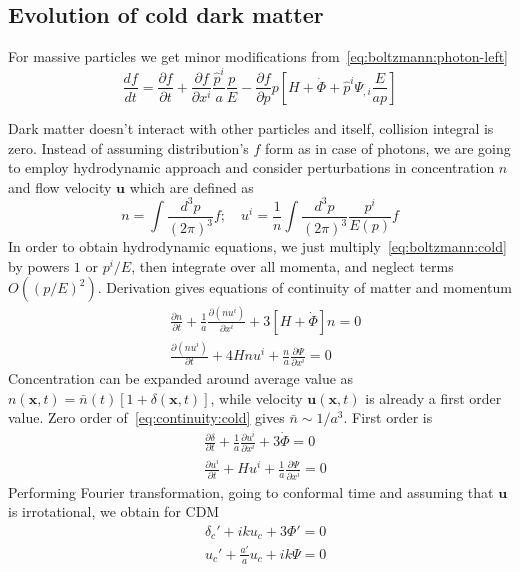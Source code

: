 \documentclass[12pt]{extarticle}
\numberwithin{problem}{section}
\numberwithin{theorem}{section}
\begin{document}
	\subsection{Evolution of cold dark matter}
	For massive particles we get minor modifications from~\ref{eq:boltzmann:photon-left}
	\begin{equation}
		\label{eq:boltzmann:cold}
		\frac{df}{dt} = \frac{\partial f}{\partial t} + \frac{\partial f}{\partial x^i}\frac{\hat{p}^i}{a}\frac{p}{E} - \frac{\partial f}{\partial p}p\left[H + \dot{\Phi} + \hat{p}^i\Psi_{,i} \frac{E}{ap}\right]
	\end{equation}
	
	Dark matter doesn't interact with other particles and itself, collision integral is zero. Instead of assuming distribution's $f$ form as in case of photons, we are going to employ hydrodynamic approach and consider perturbations in concentration $n$ and flow velocity $\mathbf{u}$ which are defined as
	\begin{equation}
		n = \int\frac{d^3p}{(2\pi)^3} f;\quad u^i = \frac{1}{n}\int\frac{d^3p}{(2\pi)^3} \frac{p^i}{E(p)}f
	\end{equation}
	In order to obtain hydrodynamic equations, we just multiply~\ref{eq:boltzmann:cold} by powers $1$ or $p^i/E$, then integrate over all momenta, and neglect terms $O((p/E)^2)$. Derivation gives equations of continuity of matter and momentum
	\begin{align}
		\label{eq:continuity:cold}
		& \frac{\partial n}{\partial t} + \frac{1}{a}\frac{\partial (nu^i)}{\partial x^i} + 3[H + \dot{\Phi}]n = 0\\
		\label{eq:momentum:cold}
		& \frac{\partial(nu^i)}{\partial t} + 4Hnu^i + \frac{n}{a}\frac{\partial \Psi}{\partial x^i} = 0
	\end{align}
	Concentration can be expanded around average value as $n(\mathbf{x}, t) = \bar{n}(t)[1 + \delta(\mathbf{x}, t)]$, while velocity $\mathbf{u}(\mathbf{x}, t)$ is already a first order value. Zero order of~\ref{eq:continuity:cold} gives $\bar{n}\sim 1/a^3$. First order is
	\begin{align}
		& \frac{\partial\delta}{\partial t} + \frac{1}{a}\frac{\partial u^i}{\partial x^i} + 3\dot{\Phi} = 0 \\
		& \frac{\partial u^i}{\partial t} + Hu^i + \frac{1}{a}\frac{\partial\Psi}{\partial x^i} = 0
	\end{align}
	Performing Fourier transformation, going to conformal time and assuming that $\mathbf{u}$ is irrotational, we obtain for CDM
	\begin{align}
		\label{eq:density:cold}
		& \delta_c' + iku_c + 3\Phi' = 0\\
		& u_c' + \frac{a'}{a}u_c + ik\Psi = 0
	\end{align}
\end{document}

